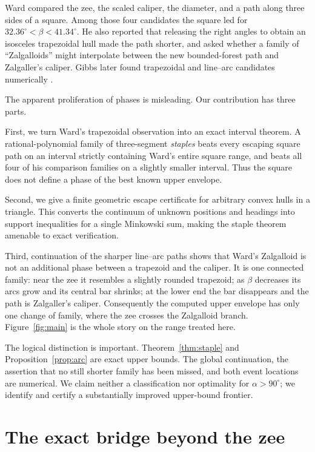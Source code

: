 \documentclass[11pt]{amsart}
\theoremstyle{remark}
\begin{document}
Ward \cite{ward2008} compared the zee, the scaled caliper, the diameter,
and a path along three sides of a square.  Among those four candidates the
square led for $32.36^\circ<\beta<41.34^\circ$.  He also reported that
releasing the right angles to obtain an isosceles trapezoidal hull made the
path shorter, and asked whether a family of ``Zalgalloids'' might interpolate
between the new bounded-forest path and Zalgaller's caliper.  Gibbs later
found trapezoidal and line--arc candidates numerically \cite{gibbs2016}.

The apparent proliferation of phases is misleading.  Our contribution has
three parts.

First, we turn Ward's trapezoidal observation into an exact interval theorem.
A rational-polynomial family of three-segment \emph{staples} beats every
escaping square path on an interval strictly containing Ward's entire square
range, and beats all four of his comparison families on a slightly smaller
interval.  Thus the square does not define a phase of the best known upper
envelope.

Second, we give a finite geometric escape certificate for arbitrary convex
hulls in a triangle.  This converts the continuum of unknown positions and
headings into support inequalities for a single Minkowski sum, making the
staple theorem amenable to exact verification.

Third, continuation of the sharper line--arc paths shows that Ward's
Zalgalloid is not an additional phase between a trapezoid and the caliper.
It is one connected family: near the zee it resembles a slightly rounded
trapezoid; as $\beta$ decreases its arcs grow and its central bar shrinks;
at the lower end the bar disappears and the path is Zalgaller's caliper.
Consequently the computed upper envelope has only one change of family,
where the zee crosses the Zalgalloid branch.  Figure~\ref{fig:main} is the
whole story on the range treated here.

The logical distinction is important.  Theorem~\ref{thm:staple} and
Proposition~\ref{prop:arc} are exact upper bounds.  The global continuation,
the assertion that no still shorter family has been missed, and both event
locations are numerical.  We claim neither a classification nor optimality
for $\alpha>90^\circ$; we identify and certify a substantially improved
upper-bound frontier.

\section{The exact bridge beyond the zee}\label{sec:staple}
\end{document}
